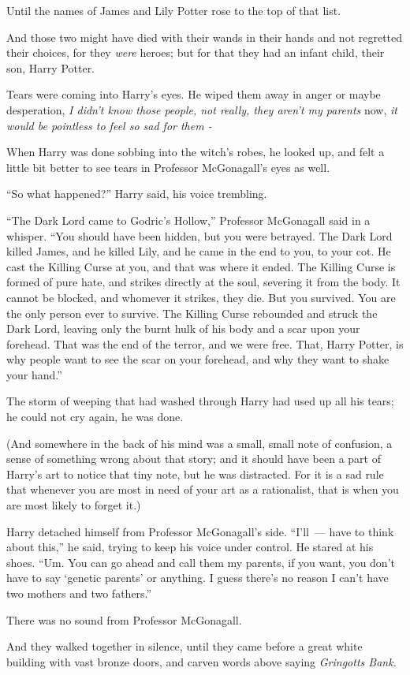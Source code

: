 Until the names of James and Lily Potter rose to the top of that list.

And those two might have died with their wands in their hands and not regretted their choices, for they \emph{were} heroes; but for that they had an infant child, their son, Harry Potter.

Tears were coming into Harry's eyes. He wiped them away in anger or maybe desperation, \emph{I didn't know those people, not really, they aren't my parents} now, \emph{it would be pointless to feel so sad for them -}

When Harry was done sobbing into the witch's robes, he looked up, and felt a little bit better to see tears in Professor McGonagall's eyes as well.

``So what happened?'' Harry said, his voice trembling.

``The Dark Lord came to Godric's Hollow,'' Professor McGonagall said in a whisper. ``You should have been hidden, but you were betrayed. The Dark Lord killed James, and he killed Lily, and he came in the end to you, to your cot. He cast the Killing Curse at you, and that was where it ended. The Killing Curse is formed of pure hate, and strikes directly at the soul, severing it from the body. It cannot be blocked, and whomever it strikes, they die. But you survived. You are the only person ever to survive. The Killing Curse rebounded and struck the Dark Lord, leaving only the burnt hulk of his body and a scar upon your forehead. That was the end of the terror, and we were free. That, Harry Potter, is why people want to see the scar on your forehead, and why they want to shake your hand.''

The storm of weeping that had washed through Harry had used up all his tears; he could not cry again, he was done.

(And somewhere in the back of his mind was a small, small note of confusion, a sense of something wrong about that story; and it should have been a part of Harry's art to notice that tiny note, but he was distracted. For it is a sad rule that whenever you are most in need of your art as a rationalist, that is when you are most likely to forget it.)

Harry detached himself from Professor McGonagall's side. ``I'll~--- have to think about this,'' he said, trying to keep his voice under control. He stared at his shoes. ``Um. You can go ahead and call them my parents, if you want, you don't have to say `genetic parents' or anything. I guess there's no reason I can't have two mothers and two fathers.''

There was no sound from Professor McGonagall.

And they walked together in silence, until they came before a great white building with vast bronze doors, and carven words above saying \emph{Gringotts Bank.}
